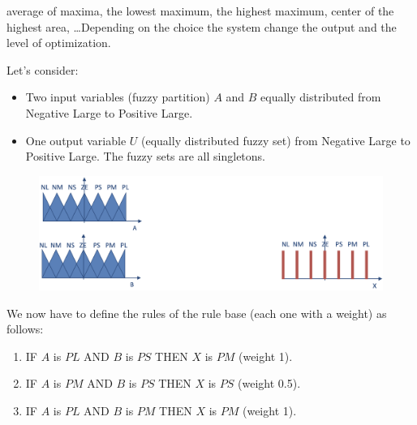 \documentclass[12pt, a4paper]{report}
\theoremstyle{remark}
\begin{document}
    average of maxima, the lowest maximum, the highest maximum, center of the highest area, \dots Depending on the choice the system change the 
    output and the level of optimization. 
    \begin{example}
        Let's consider:
        \begin{itemize}
            \item Two input variables (fuzzy partition) $A$ and $B$ equally distributed from Negative Large to Positive Large. 
            \item One output variable $U$ (equally distributed fuzzy set) from Negative Large to Positive Large. The fuzzy sets are all singletons.
        \end{itemize} 
        \begin{figure}[H]
            \centering
            \includegraphics[width=0.75\linewidth]{images/rules.png}
        \end{figure}
        We now have to define the rules of the rule base (each one with a weight) as follows: 
        \begin{enumerate}
            \item IF $A$ is $PL$ AND $B$ is $PS$ THEN $X$ is $PM$ (weight 1).
            \item IF $A$ is $PM$ AND $B$ is $PS$ THEN $X$ is $PS$ (weight 0.5).
            \item IF $A$ is $PL$ AND $B$ is $PM$ THEN $X$ is $PM$ (weight 1).
        \end{enumerate}


\end{example}
\end{document}
